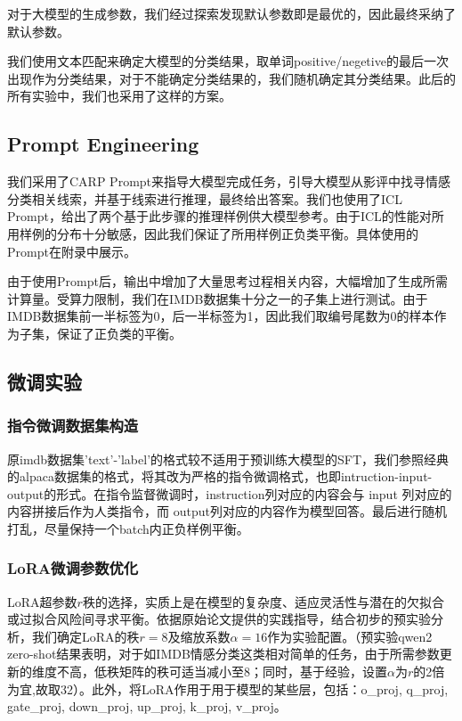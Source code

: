 \documentclass{article}
\begin{document}
对于大模型的生成参数，我们经过探索发现默认参数即是最优的，因此最终采纳了默认参数。

我们使用文本匹配来确定大模型的分类结果，取单词positive/negetive的最后一次出现作为分类结果，对于不能确定分类结果的，我们随机确定其分类结果。此后的所有实验中，我们也采用了这样的方案。

\subsection{Prompt Engineering}
我们采用了CARP Prompt来指导大模型完成任务，引导大模型从影评中找寻情感分类相关线索，并基于线索进行推理，最终给出答案。我们也使用了ICL Prompt，给出了两个基于此步骤的推理样例供大模型参考。由于ICL的性能对所用样例的分布十分敏感，因此我们保证了所用样例正负类平衡。具体使用的Prompt在附录中展示。

由于使用Prompt后，输出中增加了大量思考过程相关内容，大幅增加了生成所需计算量。受算力限制，我们在IMDB数据集十分之一的子集上进行测试。由于IMDB数据集前一半标签为0，后一半标签为1，因此我们取编号尾数为0的样本作为子集，保证了正负类的平衡。

\subsection{微调实验}
\subsubsection{指令微调数据集构造}
原imdb数据集'text'-'label'的格式较不适用于预训练大模型的SFT，我们参照经典的alpaca数据集的格式，将其改为严格的指令微调格式，也即intruction-input-output的形式。在指令监督微调时，instruction列对应的内容会与 input 列对应的内容拼接后作为人类指令，而 output列对应的内容作为模型回答。最后进行随机打乱，尽量保持一个batch内正负样例平衡。
\subsubsection{LoRA微调参数优化}
LoRA超参数\(r\)秩的选择，实质上是在模型的复杂度、适应灵活性与潜在的欠拟合或过拟合风险间寻求平衡。依据原始论文\cite{hu2021lora}提供的实践指导，结合初步的预实验分析，我们确定LoRA的秩\(r=8\)及缩放系数\(\alpha=16\)作为实验配置。（预实验qwen2 zero-shot结果表明，对于如IMDB情感分类这类相对简单的任务，由于所需参数更新的维度不高，低秩矩阵的秩可适当减小至8；同时，基于经验，设置\(\alpha\)为\(r\)的2倍为宜,故取32）。此外，将LoRA作用于用于模型的某些层，包括：o\_proj, q\_proj, gate\_proj, down\_proj, up\_proj, k\_proj, v\_proj。
\end{document}
